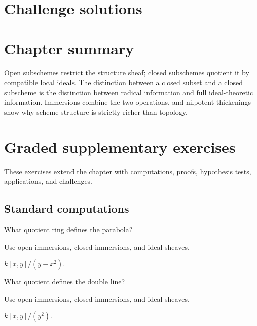 \ifdefined\IncludeChallengeSolutions
\section{Challenge solutions}

\fi

\section{Chapter summary}
Open subschemes restrict the structure sheaf; closed subschemes quotient it by compatible local
ideals.  The distinction between a closed subset and a closed subscheme is the distinction between
radical information and full ideal-theoretic information.  Immersions combine the two operations,
and nilpotent thickenings show why scheme structure is strictly richer than topology.


\section{Graded supplementary exercises}
These exercises extend the chapter with computations, proofs, hypothesis tests, applications, and challenges.

\subsection*{Standard computations}

\begin{exercise}\label{exr:vi22-expand-01}
What quotient ring defines the parabola?
\end{exercise}
\begin{hint}
Use open immersions, closed immersions, and ideal sheaves.
\end{hint}
\begin{solution}
$k[x,y]/(y-x^2)$.
\end{solution}

\begin{exercise}\label{exr:vi22-expand-02}
What quotient defines the double line?
\end{exercise}
\begin{hint}
Use open immersions, closed immersions, and ideal sheaves.
\end{hint}
\begin{solution}
$k[x,y]/(y^2)$.
\end{solution}

